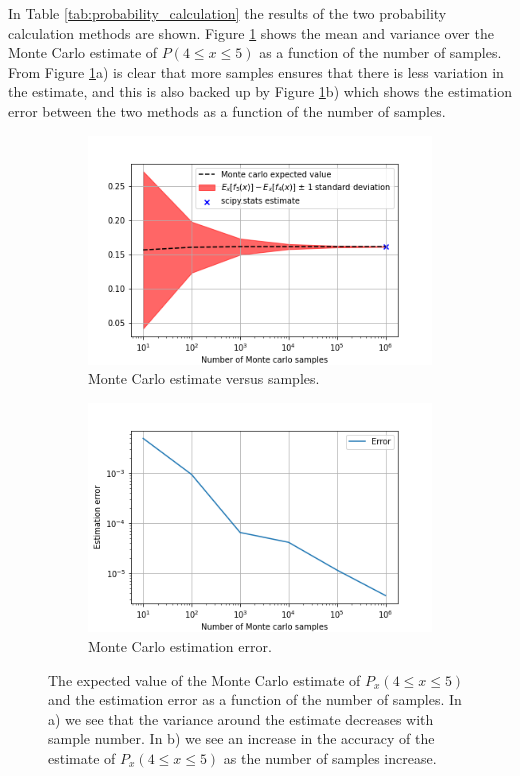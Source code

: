 \documentclass{article}
\begin{document}
In Table \ref{tab:probability_calculation} the results of the two probability calculation methods are shown. Figure \ref{fig:Q1a_4} shows the mean and variance over the Monte Carlo estimate of $P(4 \leq x \leq 5)$ as a function of the number of samples. From  Figure \ref{fig:Q1a_4}a) is clear that more samples ensures that there is less variation in the estimate, and this is also backed up by Figure \ref{fig:Q1a_4}b) which shows the estimation error between the two methods as a function of the number of samples.

\begin{figure}[!htb]
     \centering
     \begin{subfigure}[b]{0.45\textwidth}
         \centering
         \includegraphics[width=\textwidth]{Q1a_fig6.png}
         \caption{Monte Carlo estimate versus samples.}
     \end{subfigure}
     \hfill
     \begin{subfigure}[b]{0.45\textwidth}
         \centering
         \includegraphics[width=\textwidth]{Q1a_fig7.png}
         \caption{Monte Carlo estimation error.}
     \end{subfigure}
        \caption{The expected value of the Monte Carlo estimate of $P_x(4 \leq x \leq 5)$ and the estimation error as a function of the number of samples. In a) we see that the variance around the estimate decreases with sample number. In b) we see an increase in the accuracy of the estimate of $P_x(4 \leq x \leq 5)$ as the number of samples increase.}
        \label{fig:Q1a_4}
\end{figure}
\end{document}
